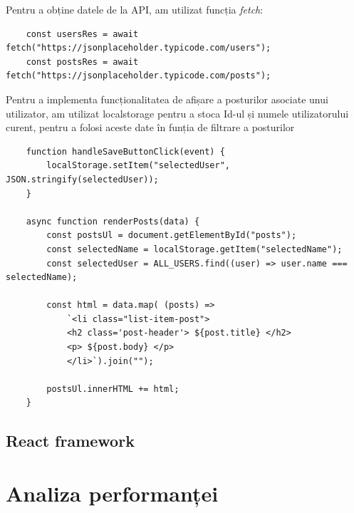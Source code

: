 \documentclass[12pt, a4paper]{report}
\begin{document}
Pentru a obține datele de la API, am utilizat funcția  \emph{fetch}:
\begin{lstlisting}
	const usersRes = await fetch("https://jsonplaceholder.typicode.com/users");
	const postsRes = await fetch("https://jsonplaceholder.typicode.com/posts");
\end{lstlisting}

Pentru a implementa funcționalitatea de afișare a posturilor asociate unui utilizator, am utilizat localstorage pentru a stoca Id-ul și numele utilizatorului curent, pentru a folosi aceste date în funția de filtrare a posturilor
\begin{lstlisting}
	function handleSaveButtonClick(event) {
		localStorage.setItem("selectedUser", JSON.stringify(selectedUser));
	}

	async function renderPosts(data) {
		const postsUl = document.getElementById("posts");
		const selectedName = localStorage.getItem("selectedName");
  		const selectedUser = ALL_USERS.find((user) => user.name === selectedName);

		const html = data.map( (posts) => 
			`<li class="list-item-post"> 
			<h2 class='post-header'> ${post.title} </h2>
			<p> ${post.body} </p>
			</li>`).join("");

	  	postsUl.innerHTML += html;
	}

\end{lstlisting}
\subsection{React framework}



\section{Analiza performanței}

\renewcommand{\bibname}{Bibliografie}

\end{document}
